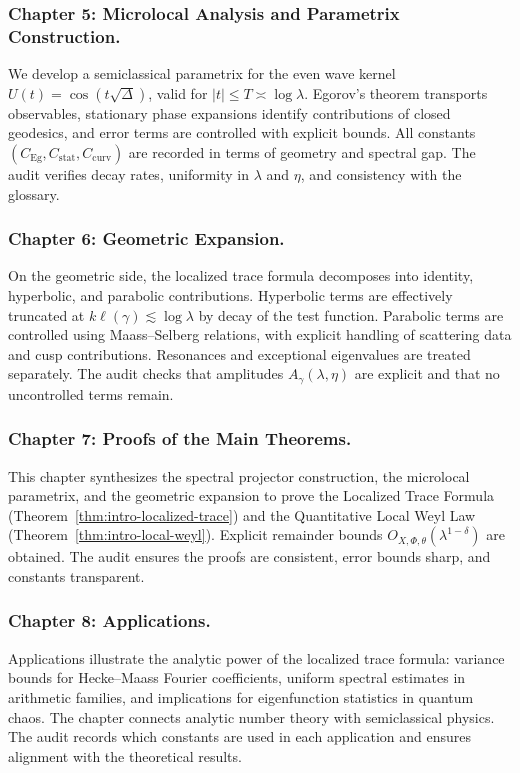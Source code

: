 \subsubsection*{Chapter 5: Microlocal Analysis and Parametrix Construction.}
We develop a semiclassical parametrix for the even wave kernel $U(t)=\cos(t\sqrt{\Delta})$,
valid for $|t|\le T\asymp\log\lambda$.
Egorov’s theorem transports observables,
stationary phase expansions identify contributions of closed geodesics,
and error terms are controlled with explicit bounds.
All constants $(C_{\mathrm{Eg}},C_{\mathrm{stat}},C_{\mathrm{curv}})$
are recorded in terms of geometry and spectral gap.
The audit verifies decay rates, uniformity in $\lambda$ and $\eta$,
and consistency with the glossary.

\subsubsection*{Chapter 6: Geometric Expansion.}
On the geometric side,
the localized trace formula decomposes into identity, hyperbolic, and parabolic contributions.
Hyperbolic terms are effectively truncated at $k\ell(\gamma)\lesssim \log\lambda$
by decay of the test function.
Parabolic terms are controlled using Maass–Selberg relations,
with explicit handling of scattering data and cusp contributions.
Resonances and exceptional eigenvalues are treated separately.
The audit checks that amplitudes $A_\gamma(\lambda,\eta)$ are explicit
and that no uncontrolled terms remain.

\subsubsection*{Chapter 7: Proofs of the Main Theorems.}
This chapter synthesizes the spectral projector construction, the microlocal parametrix,
and the geometric expansion to prove
the Localized Trace Formula (Theorem~\ref{thm:intro-localized-trace})
and the Quantitative Local Weyl Law (Theorem~\ref{thm:intro-local-weyl}).
Explicit remainder bounds $O_{X,\Phi,\theta}(\lambda^{1-\delta})$ are obtained.
The audit ensures the proofs are consistent,
error bounds sharp, and constants transparent.

\subsubsection*{Chapter 8: Applications.}
Applications illustrate the analytic power of the localized trace formula:
variance bounds for Hecke–Maass Fourier coefficients,
uniform spectral estimates in arithmetic families,
and implications for eigenfunction statistics in quantum chaos.
The chapter connects analytic number theory with semiclassical physics.
The audit records which constants are used in each application
and ensures alignment with the theoretical results.

